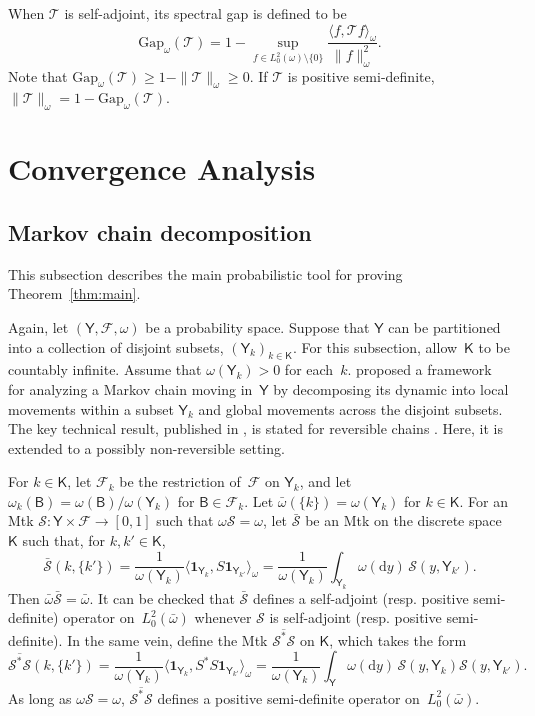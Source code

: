 \documentclass[12pt]{article}
\newcommand{\df}{\mathrm{d}}
\newcommand{\Y}{\mathsf{Y}}
\newcommand{\F}{\mathcal{F}}
\newcommand{\ind}{\mathbf{1}}
\newcommand{\Mtk}{\mtkfont{T}}
\newcommand{\mtkfont}{\mathcal}
\begin{document}
When $\Mtk$ is self-adjoint, its spectral gap is defined to be
\[
\mbox{Gap}_{\omega} (\Mtk) = 1 - \sup_{f \in L_0^2(\omega) \setminus \{0\}} \frac{\langle f, \Mtk f \rangle_{\omega}}{\|f\|_{\omega}^2}.
\]
Note that $	\mbox{Gap}_{\omega} (\Mtk) \geq 1 - \|\Mtk\|_{\omega} \geq 0$.
If $\Mtk$ is positive semi-definite, $\|\Mtk \|_{\omega} = 1 - \mbox{Gap}_{\omega}(\Mtk)$.



\section{Convergence Analysis} \label{sec:main}

\subsection{Markov chain decomposition}

This subsection describes the main probabilistic tool for proving Theorem~\ref{thm:main}.

Again, let $(\Y, \F, \omega)$ be a probability space.
Suppose that $\Y$ can be partitioned into a collection of disjoint subsets, $(\Y_k)_{k \in \mathsf{K}}$.
For this subsection, allow~$\mathsf{K}$ to be countably infinite.
Assume that $\omega(\Y_k) > 0$ for each~$k$.
\cite{caracciolo1992two} proposed a framework for analyzing a Markov chain moving in~$\Y$ by decomposing its dynamic into local movements within a subset $\Y_k$ and global movements across the disjoint subsets.
The key technical result, published in \cite{madras2002markov}, is stated for reversible chains \citep[see also, e.g.,][]{guan2007small,woodard2009conditions}.
Here, it is extended to a possibly non-reversible setting.


For $k \in \mathsf{K}$, let $\F_k$ be the restriction of~$\F$ on $\Y_k$, and let $\omega_k(\mathsf{B}) = \omega(\mathsf{B})/\omega(\Y_k)$ for $\mathsf{B} \in \F_k$.
Let $\bar{\omega}(\{k\}) = \omega(\Y_k)$ for $k \in \mathsf{K}$.
{ For an Mtk $\mtkfont{S}: \Y \times \F \to [0,1]$ such that $\omega \mtkfont{S} = \omega$, let
$\bar{\mtkfont{S}}$ be an Mtk on the discrete space $\mathsf{K}$ such that, for $k, k' \in \mathsf{K}$, 
\[
\bar{\mtkfont{S}}(k, \{k'\}) = \frac{1}{\omega(\Y_k)} \langle \ind_{\Y_k}, S \ind_{\Y_{k'}} \rangle_{\omega} = \frac{1}{\omega(\Y_k)} \int_{\Y_k} \omega(\df y) \, \mtkfont{S}(y, \Y_{k'}).
\] 
Then $\bar{\omega} \bar{\mtkfont{S}} = \bar{\omega}$.
It can be checked that $\bar{\mtkfont{S}}$ defines a self-adjoint (resp. positive semi-definite) operator on~$L_0^2(\bar{\omega})$ whenever $\mtkfont{S}$ is self-adjoint (resp. positive semi-definite). }
In the same vein, define the Mtk $\overline{\mtkfont{S}^*\mtkfont{S}}$ on $\mathsf{K}$, which takes the form
\[
\overline{\mtkfont{S}^*\mtkfont{S}}(k,\{k'\}) = \frac{1}{\omega(\Y_k)} \langle \ind_{\Y_k}, S^* S \ind_{\Y_{k'}} \rangle_{\omega} = \frac{1}{\omega(\Y_k)} \int_{\Y} \omega(\df y) \, \mtkfont{S}(y, \Y_k) \mtkfont{S}(y, \Y_{k'}).
\]
As long as $\omega \mtkfont{S} = \omega$, $\overline{\mtkfont{S}^*\mtkfont{S}}$ defines a positive semi-definite operator on~$L_0^2(\bar{\omega})$.
\end{document}
